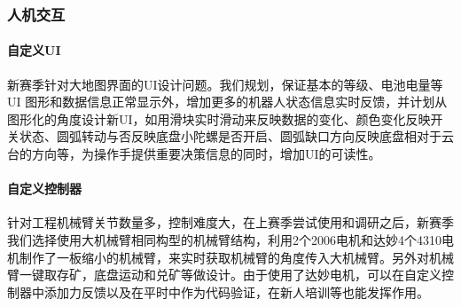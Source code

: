 \subsubsection{人机交互}

    \paragraph{自定义UI}

        新赛季针对大地图界面的UI设计问题。我们规划，保证基本的等级、电池电量等 UI 图形和数据信息正常显示外，增加更多的机器人状态信息实时反馈，并计划从图形化的角度设计新UI，如用滑块实时滑动来反映数据的变化、颜色变化反映开关状态、圆弧转动与否反映底盘小陀螺是否开启、圆弧缺口方向反映底盘相对于云台的方向等，为操作手提供重要决策信息的同时，增加UI的可读性。
    
    \paragraph{自定义控制器}

        针对工程机械臂关节数量多，控制难度大，在上赛季尝试使用和调研之后，新赛季我们选择使用大机械臂相同构型的机械臂结构，利用2个2006电机和达妙4个4310电机制作了一板缩小的机械臂，来实时获取机械臂的角度传入大机械臂。另外对机械臂一键取存矿，底盘运动和兑矿等做设计。由于使用了达妙电机，可以在自定义控制器中添加力反馈以及在平时中作为代码验证，在新人培训等也能发挥作用。

\newpage
    